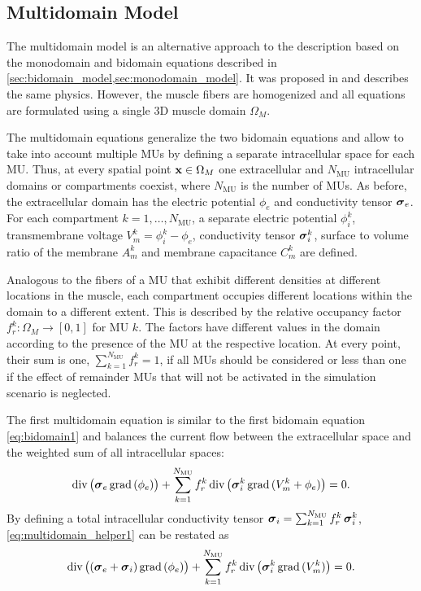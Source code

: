 \subsection{Multidomain Model}\label{sec:multidomain_model}

The multidomain model is an alternative approach to the description based on the monodomain and bidomain equations described in \cref{sec:bidomain_model,sec:monodomain_model}. It was proposed in \cite{Klotz2020} and describes the same physics. However, the muscle fibers are homogenized and all equations are formulated using a single 3D muscle domain $\Omega_M$.

The multidomain equations generalize the two bidomain equations and allow to take into account multiple MUs by defining a separate intracellular space for each MU. Thus, at every spatial point $\textbf{x} \in \Omega_M$ one extracellular and  $N_\text{MU}$ intracellular domains or compartments coexist, where $N_\text{MU}$ is the number of MUs. As before, the extracellular domain has the electric potential $\phi_e$ and  conductivity tensor $\boldsymbol{\sigma}_e$. For each compartment $k = 1, \dots, N_\text{MU}$, a separate electric potential $\phi_i^k$, transmembrane voltage $V_m^k = \phi_i^k-\phi_e$, conductivity tensor $\boldsymbol{\sigma}_i^k$, surface to volume ratio of the membrane $A_m^k$ and membrane capacitance $C_m^k$ are defined.

Analogous to the fibers of a MU that exhibit different densities at different locations in the muscle, each compartment occupies different locations within the domain to a different extent. This is described by the relative occupancy factor $f_r^k: \Omega_M \to [0,1]$ for MU $k$. The factors have different values in the domain according to the presence of the MU at the respective location. At every point, their sum is one, $\sum_{k=1}^{N_\text{MU}} f_r^k = 1$, if all MUs should be considered or less than one if the effect of remainder MUs that will not be activated in the simulation scenario is neglected.

The first multidomain equation is similar to the first bidomain equation \cref{eq:bidomain1} and balances the current flow between the extracellular space and the weighted sum of all intracellular spaces:%
\begin{align}\label{eq:multidomain_helper1}
  \hbox{div} \,\big(\boldsymbol{\sigma}_e\,\hbox{grad} \,(\phi_e)\big)  + \displaystyle\sum\limits_{k=1}^{N_\text{MU}} f_r^k\,\hbox{div} \,\big(\boldsymbol{\sigma}_i^k\,\hbox{grad} \,(V_m^k + \phi_e)\big) = 0.
\end{align}
By defining a total intracellular conductivity tensor $\boldsymbol{\sigma}_i = \sum_{k=1}^{N_\text{MU}}f_r^k\,\boldsymbol{\sigma}_i^k$, \cref{eq:multidomain_helper1} can be restated as
%
\begin{align}\label{eq:multidomain1}
  \hbox{div} \,\big((\boldsymbol{\sigma}_e + \boldsymbol{\sigma}_i)\,\hbox{grad} \,(\phi_e)\big) + \sum\limits_{k=1}^{N_\text{MU}} f_r^k\,\hbox{div} \,\big(\boldsymbol{\sigma}_i^k\,\hbox{grad} \,(V_m^k)\big) = 0.
\end{align}

